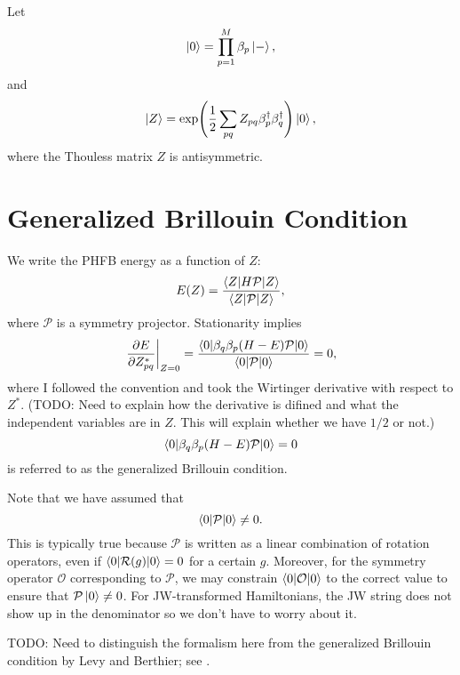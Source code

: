 \documentclass[11pt,letterpaper]{article}
\begin{document}
Let
\begin{equation}
  \label{eq:hfb}
  \ket{0} = \prod_{p=1}^M \beta_p \ket{-},
\end{equation}
and
\begin{equation}
  \ket{Z} = \exp(\frac{1}{2} \sum_{pq} Z_{pq} \beta^\dag_p \beta^\dag_q) \ket{0},
\end{equation}
where the Thouless matrix $Z$ is antisymmetric.


\section{Generalized Brillouin Condition}

We write the PHFB energy as a function of $Z$:
\begin{equation}
  E(Z) =
  \frac{\braket{Z|H\mathcal{P}|Z}}{\braket{Z|\mathcal{P}|Z}},
\end{equation}
where $\mathcal{P}$ is a symmetry projector.
Stationarity implies
\begin{equation}
  \label{eq:stationarity}
  \left.\frac{\partial E}{\partial Z^*_{pq}}\right|_{Z=0}
  = \frac{\braket{0|\beta_q \beta_p  (H - E)\mathcal{P}|0}}{\braket{0|\mathcal{P}|0}}
  = 0,
\end{equation}
where I followed the convention and took the Wirtinger derivative with respect to $Z^*$.
(TODO: Need to explain how the derivative is difined and what the independent variables
are in $Z$. This will explain whether we have $1/2$ or not.)
\begin{equation}
  \label{eq:brillouin}
  \braket{0|\beta_q \beta_p (H - E)\mathcal{P}|0} = 0
\end{equation}
is referred to as the generalized Brillouin condition.

Note that we have assumed that
\begin{equation}
  \braket{0|\mathcal{P}|0} \neq 0.
\end{equation}
This is typically true because $\mathcal{P}$ is written as a linear combination of rotation operators,
even if $\braket{0|\mathcal{R}(g)|0} = 0$ for a certain $g$.
Moreover, for the symmetry operator $\mathcal{O}$ corresponding to $\mathcal{P}$,
we may constrain $\braket{0|\mathcal{O}|0}$ to the correct value to ensure that
$\mathcal{P} \ket{0} \neq 0$.
For JW-transformed Hamiltonians, the JW string does not show up in the denominator
so we don't have to worry about it.

TODO: Need to distinguish the formalism here from the generalized Brillouin condition
by Levy and Berthier; see \cite{Kutzelnigg1979}.
\end{document}
